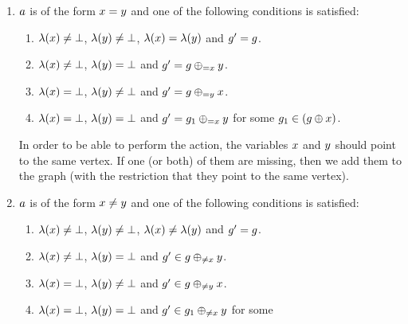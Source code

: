 \begin{enumerate}
\item
\label{pre:case:equals}%
  $a$ is of the form $x=y$ and one of the
  following conditions is satisfied:
  \begin{enumerate}
  \item
    \label{pre:case:equalsA}%
    $\lambda(x)\neq\bot$, %
    $\lambda(y)\neq\bot$, %
    $\lambda(x)=\lambda(y)$ and $g'=g$.
  \item
    \label{pre:case:equalsB}%
    $\lambda(x)\neq\bot$, %
    $\lambda(y)=\bot$ and
    $g'=g\oplus_{={x}}{y}$.
  \item
    \label{pre:case:equalsC}%
    $\lambda(x)=\bot$, %
    $\lambda(y)\neq\bot$ and
    $g'=g\oplus_{={y}}{x}$.
  \item
    \label{pre:case:equalsD}%
    $\lambda(x)=\bot$, %
    $\lambda(y)=\bot$ and
    $g'=g_1\oplus_{={x}}{y}$ for some
    $g_1\in\left(g\oplus{\ensuremath{x}}\right)$.
  \end{enumerate}
In order to be able to perform the action, the variables
$x$ and $y$ should point to the same vertex.
%
If one (or both) of them are missing, then we add them to the graph
(with the restriction that they point to the same vertex).
\item
  $a$ is of the form $x\neq y$ and one of the
  following conditions is satisfied:
  \begin{enumerate}
  \item \label{pre:case:notEqualsA}%
    $\lambda(x)\neq\bot$, %
    $\lambda(y)\neq\bot$, %
    $\lambda(x)\neq\lambda(y)$ and $g'=g$.
  \item \label{pre:case:notEqualsB}%
    $\lambda(x)\neq\bot$, %
    $\lambda(y)=\bot$ and %
    $g'\in g\oplus_{\neq{\ensuremath{x}}}{y}$.
  \item \label{pre:case:notEqualsC}%
    $\lambda(x)=\bot$, %
    $\lambda(y)\neq\bot$ and %
    $g'\in g\oplus_{\neq{\ensuremath{y}}}{x}$.
  \item \label{pre:case:notEqualsD}%
    $\lambda(x)=\bot$, %
    $\lambda(y)=\bot$ and %
    $g'\in g_1\oplus_{\neq{\ensuremath{x}}}{y}$ for some

\end{enumerate}
\end{enumerate}
